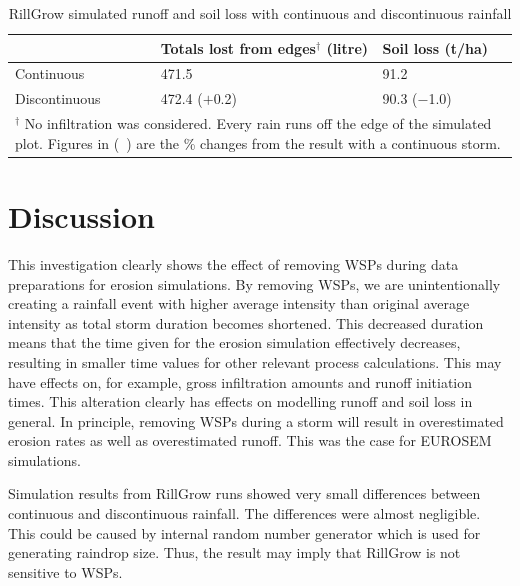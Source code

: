 \begin{table}[htbp]
  \centering
  \caption{RillGrow simulated runoff and soil loss with continuous and
discontinuous rainfall}
  \label{tab:RillGrowRunoffAndSoilLossWithContAndDiscontRainfall}
    \begin{tabular}{lll}
      \toprule
  & Totals lost from edges$^\dagger$ (litre) & Soil loss (t/ha) \\
      \midrule
      Continuous & 471.5 & 91.2 \\
      Discontinuous & 472.4 ($+$0.2)& 90.3 ($-$1.0)\\
      \bottomrule
      \multicolumn{3}{p{11cm}}{\footnotesize $^\dagger$ No infiltration was
considered. Every rain runs off the edge of the simulated plot. Figures in (\ )
are the \% changes from the result with a continuous storm.}
    \end{tabular}
\end{table}


\section{Discussion}
\label{sec:InterStormPeriodsWithinAStormDiscussion}

This investigation clearly shows the effect of removing WSPs during data
preparations for erosion simulations. By removing WSPs, we are unintentionally
creating a rainfall event with higher average intensity than original average
intensity as total storm duration becomes shortened. This decreased duration
means that the time given for the erosion simulation effectively decreases,
resulting in smaller time values for other relevant process calculations. This
may have effects on, for example, gross infiltration amounts and runoff
initiation times. This alteration clearly has effects on modelling
runoff and soil loss in general. In principle, removing WSPs during a storm will
result in overestimated erosion rates as well as overestimated runoff. This was
the case for EUROSEM simulations.

Simulation results from RillGrow runs showed very small differences between
continuous and discontinuous rainfall. The differences were almost negligible.
This could be caused by internal random number generator which is used for
generating raindrop size. Thus, the result may imply that RillGrow is not
sensitive to WSPs.


